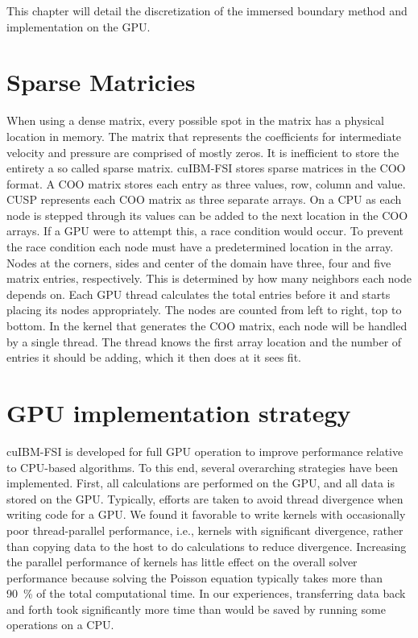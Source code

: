 This chapter will detail the discretization of the immersed boundary method and implementation on the GPU. 

\section{Sparse Matricies}
When using a dense matrix, every possible spot in the matrix has a physical location in memory. 
The matrix that represents the coefficients for intermediate velocity and pressure are comprised of mostly zeros. 
It is inefficient to store the entirety a so called sparse matrix. 
cuIBM-FSI stores sparse matrices in the COO format. 
A COO matrix stores each entry as three values, row, column and value. 
CUSP represents each COO matrix as three separate arrays. 
On a CPU as each node is stepped through its values can be added to the next location in the COO arrays. 
If a GPU were to attempt this, a race condition would occur. 
To prevent the race condition each node must have a predetermined location in the array. 
Nodes at the corners, sides and center of the domain have three, four and five matrix entries, respectively. 
This is determined by how many neighbors each node depends on. 
Each GPU thread calculates the total entries before it and starts placing its nodes appropriately. 
The nodes are counted from left to right, top to bottom. 
In the kernel that generates the COO matrix, each node will be handled by a single thread. 
The thread knows the first array location and the number of entries it should be adding, which it then does at it sees fit.

\section{GPU implementation strategy}
\label{GPU implementation strategy}
cuIBM-FSI is developed for full GPU operation to improve performance relative to CPU-based algorithms. 
To this end, several overarching strategies have been implemented. 
First, all calculations are performed on the GPU, and all data is stored on the GPU.
Typically, efforts are taken to avoid thread divergence when writing code for a GPU. 
We found it favorable to write kernels with occasionally poor thread-parallel performance, i.e., kernels with significant divergence, rather than copying data to the host to do calculations to reduce divergence. 
Increasing the parallel performance of kernels has little effect on the overall solver performance because solving the Poisson equation typically takes more than \SI{90}{\percent} of the total computational time. 
In our experiences, transferring data back and forth took significantly more time than would be saved by running some operations on a CPU. 

